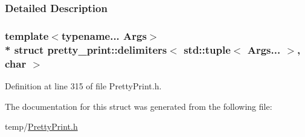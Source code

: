 \subsubsection{Detailed Description}
\subsubsection*{template$<$typename... Args$>$\\*
struct pretty\+\_\+print\+::delimiters$<$ std\+::tuple$<$ Args... $>$, char $>$}



Definition at line 315 of file Pretty\+Print.\+h.



The documentation for this struct was generated from the following file\+:\begin{DoxyCompactItemize}
\item 
temp/\hyperlink{PrettyPrint_8h}{Pretty\+Print.\+h}\end{DoxyCompactItemize}
